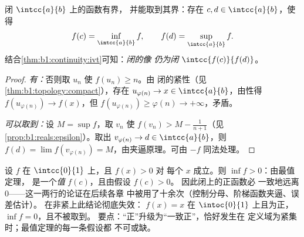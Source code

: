 \begin{theorem}[最值定理]\label{thm:b1:continuity:evt}
闭 $\intcc{a}{b}$ 上的函数有界，
并能取到其界：存在 $c, d \in \intcc{a}{b}$，使得
\[
f(c) = \inf_{\intcc{a}{b}} f,
\qquad
f(d) = \sup_{\intcc{a}{b}} f .
\]
结合\cref{thm:b1:continuity:ivt}可知：\emph{闭的像
仍为闭} $\intcc{f(c)}{f(d)}$。
\end{theorem}

\begin{proof}
\emph{有：}否则取 $u_n$ 使 $f(u_n) \geq n$。由
闭的紧性（见\cref{thm:b1:topology:compact}），存在
$u_{\varphi(n)} \to x \in \intcc{a}{b}$，由性得
$f(u_{\varphi(n)}) \to f(x)$，但 $f(u_{\varphi(n)}) \geq \varphi(n)
\to +\infty$，矛盾。

\emph{可以取到：}设 $M = \sup f$，取 $v_n$ 使 $f(v_n) >
M - \frac{1}{n+1}$（见\cref{prop:b1:reals:epsilon}）。取出
$v_{\varphi(n)} \to d \in \intcc{a}{b}$，则 $f(d) = \lim
f(v_{\varphi(n)}) = M$，由夹逼原理。可由
$-f$ 同法处理。
\end{proof}

\begin{example}[闭区间上的正下界]\label{ex:b1:continuity:posmin}
设 $f$ 在 $\intcc{0}{1}$ 上，且 $f(x) > 0$ 对
每个 $x$ 成立。则 $\inf f > 0$：由最值定理，
是一个\emph{值} $f(c)$，且由假设 $f(c) > 0$。
因此闭上的正函数必
一致地远离 $0$——这一两行的论证在后续各章
中被用了十余次（控制分母、阶梯函数夹逼、误差估计）。
在非紧上此结论彻底失效：
$f(x) = x$ 在 $\intoc{0}{1}$ 上且为正，
$\inf f = 0$，且不被取到。
要点：“正”升级为“一致正”，恰好发生在
定义域为紧集时；最值定理的每一条假设都
不可或缺。
\end{example}

